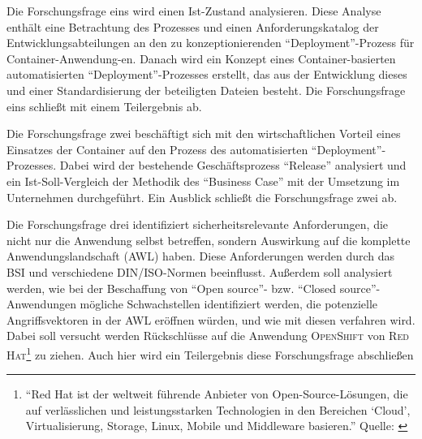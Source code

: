 Die Forschungsfrage eins wird einen Ist-Zustand analysieren. Diese Analyse enthält eine Betrachtung des Prozesses und einen Anforderungskatalog der Entwicklungsabteilungen an den zu konzeptionierenden \enquote{Deployment}-Prozess für Container-Anwendung-en. Danach wird ein Konzept eines Container-basierten automatisierten \enquote{Deployment}-Prozesses erstellt, das aus der Entwicklung dieses und einer Standardisierung der beteiligten Dateien besteht. Die Forschungsfrage eins schließt mit einem Teilergebnis ab. \par
Die Forschungsfrage zwei beschäftigt sich mit den wirtschaftlichen Vorteil eines Einsatzes der Container auf den Prozess des automatisierten \enquote{Deployment}-Prozesses. Dabei wird der bestehende Geschäftsprozess \enquote{Release} analysiert und ein Ist-Soll-Vergleich der Methodik des \enquote{Business Case} mit der Umsetzung im Unternehmen durchgeführt. Ein Ausblick schließt die Forschungsfrage zwei ab. 
\par
Die Forschungsfrage drei identifiziert sicherheitsrelevante Anforderungen, die nicht nur die Anwendung selbst betreffen, sondern Auswirkung auf die komplette Anwendungslandschaft (\acs{AWL}) haben. Diese Anforderungen werden durch das \acl{BSI} und verschiedene \textsc{DIN/ISO}-Normen beeinflusst. Außerdem soll analysiert werden, wie bei der Beschaffung von \enquote{Open source}- bzw. \enquote{Closed source}-Anwendungen mögliche Schwachstellen identifiziert werden, die potenzielle Angriffsvektoren in der \ac{AWL} eröffnen würden, und wie mit diesen verfahren wird. Dabei soll versucht werden Rückschlüsse auf die Anwendung \textsc{OpenShift} von \textsc{Red Hat\footnote{\enquote{Red Hat ist der weltweit führende Anbieter von Open-Source-Lösungen, die auf verlässlichen und leistungsstarken Technologien in den Bereichen \enquote{Cloud}, Virtualisierung, Storage, Linux, Mobile und Middleware basieren.} Quelle: \cite[][]{red_hat_inc_red_2020}}} zu ziehen. Auch hier wird ein Teilergebnis diese Forschungsfrage abschließen


